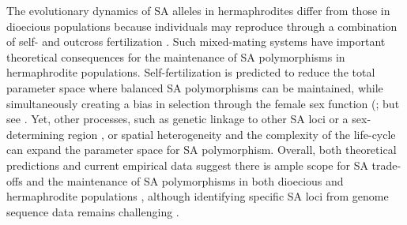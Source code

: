 \documentclass[11pt]{article}
\begin{document}
The evolutionary dynamics of SA alleles in hermaphrodites differ from those in dioecious populations because individuals may reproduce through a combination of self- and outcross fertilization \citep{Goodwillie2005, Igic2006, JarneAuld2006}. Such mixed-mating systems have important theoretical consequences for the maintenance of SA polymorphisms in hermaphrodite populations. Self-fertilization is predicted to reduce the total parameter space where balanced SA polymorphisms can be maintained, while simultaneously creating a bias in selection through the female sex function (\citealt{JordanConnallon2014}; but see \citealt{Tazzyman2015}. Yet, other processes, such as genetic linkage to other SA loci or a sex-determining region \citep{Otto2011, JordanCharlesworth2012, Olito2017, Olito2019}, or spatial heterogeneity and the complexity of the life-cycle \citep{Olito-etal-2018,ConnallonSharmaOlito2019} can expand the parameter space for SA polymorphism. Overall, both theoretical predictions and current empirical data suggest there is ample scope for SA trade-offs and the maintenance of SA polymorphisms in both dioecious and hermaphrodite populations \citep{Abbott2011, WangBarrett2020}, although identifying specific SA loci from genome sequence data remains challenging \citep{RuzickaESEB2020}.

\end{document}
